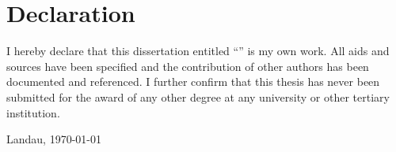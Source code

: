 
\chapter{Declaration}

I hereby declare that this dissertation entitled ``\plaintitle '' is my own work. All aids and sources have been specified and the contribution of other authors has been documented and referenced.
I further confirm that this thesis has never been submitted for the award of any other degree at any university or other tertiary institution.

\vspace{6.5em}

\noindent Landau, \today
